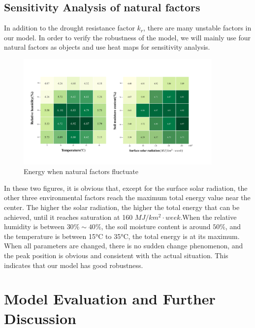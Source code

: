 \documentclass[12pt]{article}  %
\begin{document}
\vspace{-0.5cm}
\subsection{Sensitivity Analysis of natural factors}
\vspace{-0.5cm}
In addition to the drought resistance factor $k_r$, there are many unstable factors in our model. In order to verify the robustness of the model, we will mainly use four natural factors as objects and use heat maps for sensitivity analysis.

\vspace{-0.2cm}
\begin{figure}[htbp]
	\centering
	\includegraphics[width=0.9\textwidth]{easymcm/img/Heat.pdf}
	\caption{Energy when natural factors fluctuate}
 \label{fig:fignaf}
\end{figure}

\vspace{-0.3cm}
In these two figures, it is obvious that, except for the surface solar radiation, the other three environmental factors reach the maximum total energy value near the center. The higher the solar radiation, the higher the total energy that can be achieved, until it reaches saturation at 160 $MJ/km^2\cdot week$.When the relative humidity is between $30\% \sim 40\%$, the soil moisture content is around $50\%$, and the temperature is between 15°C to 35°C, the total energy is at its maximum. When all parameters are changed, there is no sudden change phenomenon, and the peak position is obvious and consistent with the actual situation. This indicates that our model has good robustness.

\section{Model Evaluation and Further Discussion}
\end{document}
